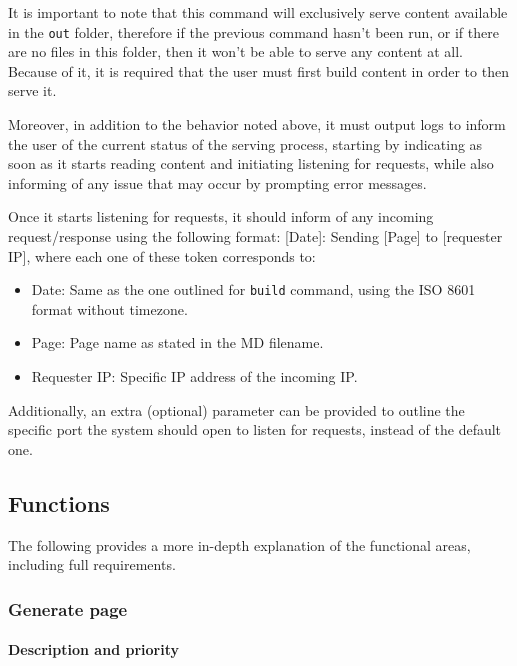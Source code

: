 It is important to note that this command will exclusively serve content
available in the \texttt{out} folder, therefore if the previous command
hasn't been run, or if there are no files in this folder, then it won't
be able to serve any content at all. Because of it, it is required that
the user must first build content in order to then serve it.

Moreover, in addition to the behavior noted above, it must output logs
to inform the user of the current status of the serving process,
starting by indicating as soon as it starts reading content and
initiating listening for requests, while also informing of any issue
that may occur by prompting error messages.

Once it starts listening for requests, it should inform of any incoming
request/response using the following format: {[}Date{]}: Sending
        {[}Page{]} to {[}requester IP{]}, where each one of these token
corresponds to:

\begin{itemize}
    \item
    Date: Same as the one outlined for \texttt{build} command, using the
    ISO 8601 format without timezone.
    \item
    Page: Page name as stated in the MD filename.
    \item
    Requester IP: Specific IP address of the incoming IP.
\end{itemize}

Additionally, an extra (optional) parameter can be provided to outline
the specific port the system should open to listen for requests, instead
of the default one.

\subsection{Functions}\label{subsec:functions}

The following provides a more in-depth explanation of the functional
areas, including full requirements.

\subsubsection{Generate page}\label{subsubsec:generate-page}

\paragraph{Description and priority}\label{par:description-and-priority}

